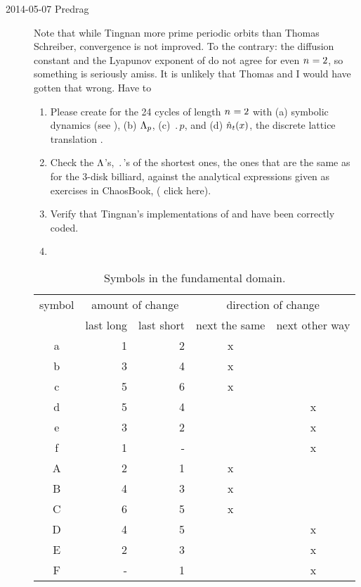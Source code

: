 \begin{description}
\item[2014-05-07 Predrag]
Note that while Tingnan more prime periodic orbits than Thomas Schreiber,
convergence is not improved. To the contrary: the diffusion constant and
the Lyapunov exponent of  do not agree for even ${n_{}}=2$,
so something is seriously amiss. It is unlikely that Thomas and
I would have gotten that wrong. Have to
\begin{enumerate}
  \item  Please create
   for the 24 cycles of length ${n_{}}=2$ with
  (a) symbolic dynamics (see ),
  (b) $\Lambda_p$,
  (c) $\period{p}$, and
  (d) $\hat n_t(x)$, the discrete lattice translation .
  \item
  Check the $\Lambda$'s, $\period{}$'s of the shortest ones, the ones
  that are the same as for the 3-disk billiard, against the analytical
  expressions given as exercises in ChaosBook,
(
{click here}).
  \item
Verify that Tingnan's implementations of  and
 have been correctly coded.
  \item {}
\end{enumerate}


\begin{table}
\begin{center}
\begin{tabular}{|c||r|r||c|c|}
\hline
symbol & \multicolumn{2}{|c||}{amount of change} &
 \multicolumn{2}{|c|}{direction of change} \\
       & last long & last short & next the same & next other way \\ \hline
a      &    1      &     2      &     x      &       \\
b      &    3      &     4      &     x      &       \\
c      &    5      &     6      &     x      &       \\
d      &    5      &     4      &            &   x    \\
e      &    3      &     2      &            &    x   \\
f      &    1      &     -      &            &    x   \\ \hline
A      &    2      &     1      &     x      &       \\
B      &    4      &     3      &     x      &       \\
C      &    6      &     5      &     x      &       \\
D      &    4      &     5      &            &    x   \\
E      &    2      &     3      &            &    x   \\
F      &    -      &     1      &            &    x   \\ \hline
\end{tabular}
\caption{\label{TSYM}
Symbols in the fundamental domain.}
\end{center}
\end{table}


\end{description}
